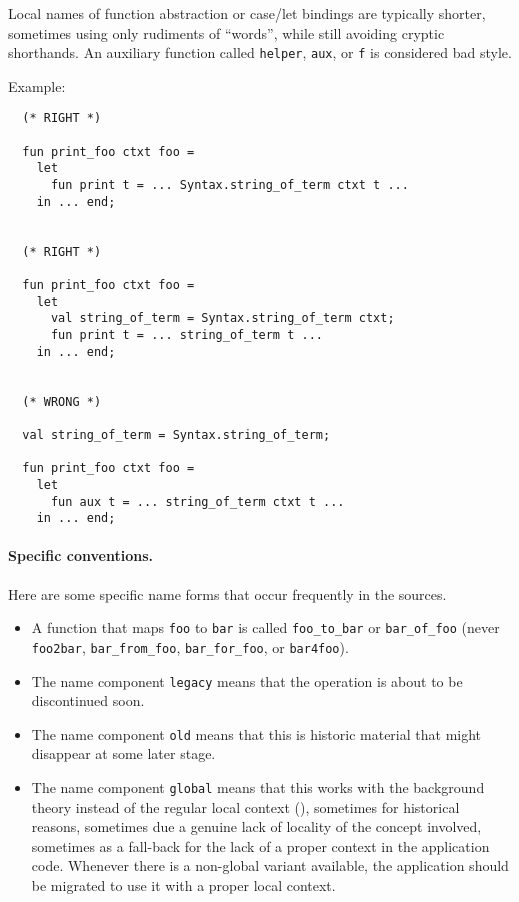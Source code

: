 \begin{isabellebody}
\begin{isamarkuptext}
  Local names of function abstraction or case/let bindings are
  typically shorter, sometimes using only rudiments of ``words'',
  while still avoiding cryptic shorthands.  An auxiliary function
  called \verb|helper|, \verb|aux|, or \verb|f| is
  considered bad style.

  Example:

  \begin{verbatim}
  (* RIGHT *)

  fun print_foo ctxt foo =
    let
      fun print t = ... Syntax.string_of_term ctxt t ...
    in ... end;


  (* RIGHT *)

  fun print_foo ctxt foo =
    let
      val string_of_term = Syntax.string_of_term ctxt;
      fun print t = ... string_of_term t ...
    in ... end;


  (* WRONG *)

  val string_of_term = Syntax.string_of_term;

  fun print_foo ctxt foo =
    let
      fun aux t = ... string_of_term ctxt t ...
    in ... end;

  \end{verbatim}


  \paragraph{Specific conventions.} Here are some specific name forms
  that occur frequently in the sources.

  \begin{itemize}

  \item A function that maps \verb|foo| to \verb|bar| is
  called \verb|foo_to_bar| or \verb|bar_of_foo| (never
  \verb|foo2bar|, \verb|bar_from_foo|, \verb|bar_for_foo|, or \verb|bar4foo|).

  \item The name component \verb|legacy| means that the operation
  is about to be discontinued soon.

  \item The name component \verb|old| means that this is historic
  material that might disappear at some later stage.

  \item The name component \verb|global| means that this works
  with the background theory instead of the regular local context
  (), sometimes for historical reasons, sometimes
  due a genuine lack of locality of the concept involved, sometimes as
  a fall-back for the lack of a proper context in the application
  code.  Whenever there is a non-global variant available, the
  application should be migrated to use it with a proper local
  context.


\end{itemize}
\end{isamarkuptext}
\end{isabellebody}
